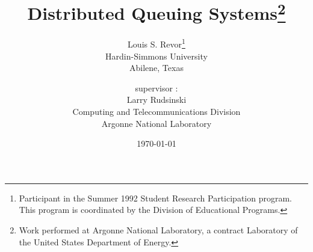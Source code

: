 \def\achilles{Sun4/490}
\def\qsub{\mbox{\it qsub}\ }
\def\qstat{\mbox{\it qstat}\ }
\def\group{\mbox{\it group}\ }
\def\queue{\mbox{\it queue}\ }
\def\queues{\mbox{\it queues}\ }
\def\qmaster{\mbox{\it qmaster}\ }
\def\pvm{PVM}

\title{Distributed Queuing Systems\thanks{Work
performed at Argonne National Laboratory, a contract Laboratory of the
United States Department of Energy.}}
\author{Louis S. Revor\thanks{
     Participant in the Summer 1992 Student Research Participation
     program.
     This program is coordinated by the Division
     of Educational Programs.}\\
     Hardin-Simmons University\\
     Abilene, Texas\\
   \and
     supervisor :\\
     Larry Rudsinski\\
     Computing and Telecommunications Division\\
     Argonne National Laboratory}
\date{\today}
\maketitle
\newpage










